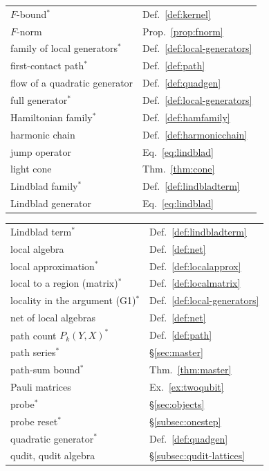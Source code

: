 {\begin{minipage}[t]{0.49\textwidth}
\begin{tabular}[t]{@{}>{\raggedright\arraybackslash}p{}@{\quad}l@{}}
$F$-bound$^*$ & Def.~\ref{def:kernel}\\
$F$-norm & Prop.~\ref{prop:fnorm}\\
family of local generators$^*$ & Def.~\ref{def:local-generators}\\
first-contact path$^*$ & Def.~\ref{def:path}\\
flow of a quadratic generator & Def.~\ref{def:quadgen}\\
full generator$^*$ & Def.~\ref{def:local-generators}\\
Hamiltonian family$^*$ & Def.~\ref{def:hamfamily}\\
harmonic chain & Def.~\ref{def:harmonicchain}\\
jump operator & Eq.~\eqref{eq:lindblad}\\
light cone & Thm.~\ref{thm:cone}\\
Lindblad family$^*$ & Def.~\ref{def:lindbladterm}\\
Lindblad generator & Eq.~\eqref{eq:lindblad}\\
\end{tabular}
\end{minipage}\hfill
\begin{minipage}[t]{0.49\textwidth}
\begin{tabular}[t]{@{}>{\raggedright\arraybackslash}p{}@{\quad}l@{}}
Lindblad term$^*$ & Def.~\ref{def:lindbladterm}\\
local algebra & Def.~\ref{def:net}\\
local approximation$^*$ & Def.~\ref{def:localapprox}\\
local to a region (matrix)$^*$ & Def.~\ref{def:localmatrix}\\
locality in the argument (G1)$^*$ & Def.~\ref{def:local-generators}\\
net of local algebras & Def.~\ref{def:net}\\
path count $P_k(Y,X)^*$ & Def.~\ref{def:path}\\
path series$^*$ & \S\ref{sec:master}\\
path-sum bound$^*$ & Thm.~\ref{thm:master}\\
Pauli matrices & Ex.~\ref{ex:twoqubit}\\
probe$^*$ & \S\ref{sec:objects}\\
probe reset$^*$ & \S\ref{subsec:onestep}\\
quadratic generator$^*$ & Def.~\ref{def:quadgen}\\
qudit, qudit algebra & \S\ref{subsec:qudit-lattices}\\

\end{tabular}
\end{minipage}}
